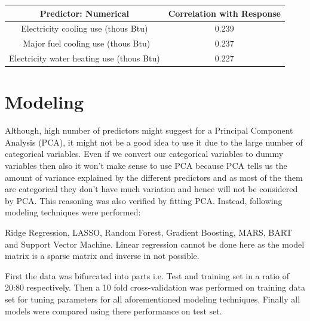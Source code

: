 \documentclass[letterpaper,12pt]{article}
\begin{document}
\begin{table} [H]
\centering 
\begin{tabular}{|c|c|} 
\hline 
Predictor: Numerical & Correlation with Response \\\hline 
Electricity cooling use (thous Btu) & 0.239 \\\
Major fuel cooling use (thous Btu) & 0.237 \\
Electricity water heating use (thous Btu) & 0.227 \\\hline 
\end{tabular} 
\end{table} 

\section{Modeling}
Although, high number of predictors might suggest for a Principal Component Analysis (PCA), it might not be a good idea to use it due to the large number of categorical variables. Even if we convert our categorical variables to dummy variables then also it won't make sense to use PCA because PCA tells us the amount of variance explained by the different predictors and as most of the them are categorical they don't have much variation and hence will not be considered by PCA. This reasoning was also verified by fitting PCA. Instead, following modeling techniques were performed:
\newline

Ridge Regression, LASSO, Random Forest, Gradient Boosting, MARS, BART and Support Vector Machine. Linear regression cannot be done here as the model matrix is a sparse matrix and inverse in not possible.
\newline

First the data was bifurcated into parts i.e. Test and training set in a ratio of 20:80 respectively. Then a 10 fold cross-validation was performed on training data set for tuning parameters for all aforementioned modeling techniques. Finally all models were compared using there performance on test set.
\end{document}
